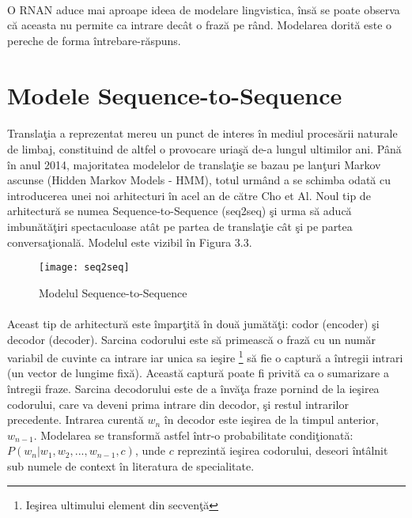 \paragraph{}
O RNAN aduce mai aproape ideea de modelare lingvistica, \^ ins\u a se poate observa c\u a aceasta nu permite ca intrare dec\^ at o fraz\u a pe r\^ and. Modelarea dorit\u a este o pereche de forma \^ intrebare-r\u aspuns.

\section{Modele Sequence-to-Sequence}

\paragraph{}
Transla\c tia a reprezentat mereu un punct de interes \^ in mediul proces\u arii naturale de limbaj, constituind de altfel o provocare uria\c s\u a de-a lungul ultimilor ani. P\^ an\u a \^ in anul 2014, majoritatea modelelor de transla\c tie se bazau pe lan\c turi Markov ascunse (Hidden Markov Models - HMM), totul urm\^ and a se schimba odat\u a cu introducerea unei noi arhitecturi \^ in acel an de c\u atre Cho et Al. Noul tip de arhitectur\u a se numea Sequence-to-Sequence (seq2seq) \c si urma s\u a aduc\u a imbun\u at\u a\c tiri spectaculoase at\^ at pe partea de transla\c tie c\^ at \c si pe partea conversa\c tional\u a. Modelul este vizibil \^ in Figura 3.3.

\begin{figure}[H]
\centering
\texttt{[image: seq2seq]}
\caption{Modelul Sequence-to-Sequence}
\end{figure}

\paragraph{}
Aceast tip de arhitectur\u a este \^ impar\c tit\u a \^ in dou\u a jum\u at\u a\c ti: codor (encoder) \c si decodor (decoder). Sarcina codorului este s\u a primeasc\u a o fraz\u a cu un num\u ar variabil de cuvinte ca intrare iar unica sa ie\c sire \footnote{Ie\c sirea ultimului element din secven\c t\u a} s\u a fie o captur\u a a \^ intregii intrari (un vector de lungime fix\u a). Aceast\u a captur\u a poate fi privit\u a ca o sumarizare a \^ intregii fraze. Sarcina decodorului este de a \^ inv\u a\c ta fraze pornind de la ie\c sirea codorului, care va deveni prima intrare din decodor, \c si restul intrarilor precedente. Intrarea curent\u a \(w_{n}\) \^ in decodor este ie\c sirea de la timpul anterior, \(w_{n-1}\). Modelarea se transform\u a astfel \^ intr-o probabilitate condi\c tionat\u a: \(P(w_{n} | w_{1}, w_{2},..., w_{n-1}, c)\), unde \(c\) reprezint\u a ie\c sirea codorului, deseori \^ int\^ alnit sub numele de context \^ in literatura de specialitate.

